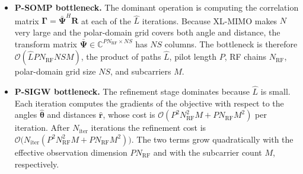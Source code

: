 \documentclass[12pt,a4paper]{article}
\begin{document}
\begin{itemize}
  \item \textbf{P-SOMP bottleneck.}
    The dominant operation is computing the correlation matrix
    $\boldsymbol{\Gamma}=\bar{\boldsymbol{\Psi}}^{H}\mathbf{R}$ at
    each of the $\hat{L}$ iterations.
    Because XL-MIMO makes $N$ very large and the polar-domain grid
    covers both angle and distance, the transform matrix
    $\bar{\boldsymbol{\Psi}}\in\mathbb{C}^{PN_{\mathrm{RF}}\times NS}$
    has $NS$ columns.
    The bottleneck is therefore
    $\mathcal{O}(\hat{L}PN_{\mathrm{RF}}NSM)$,
    the product of paths $\hat{L}$, pilot length $P$, RF chains
    $N_{\mathrm{RF}}$, polar-domain grid size $NS$, and subcarriers $M$.

  \item \textbf{P-SIGW bottleneck.}
    The refinement stage dominates because $\hat{L}$ is small.
    Each iteration computes the gradients of the objective with respect
    to the angles $\hat{\boldsymbol{\theta}}$ and distances $\hat{\mathbf{r}}$,
    whose cost is $\mathcal{O}(P^{2}N_{\mathrm{RF}}^{2}M
    +PN_{\mathrm{RF}}M^{2})$ per iteration.
    After $N_{\mathrm{iter}}$ iterations the refinement cost is
    $\mathcal{O}\!\bigl(N_{\mathrm{iter}}(P^{2}N_{\mathrm{RF}}^{2}M
      +PN_{\mathrm{RF}}M^{2})\bigr)$.
    The two terms grow quadratically with the effective observation
    dimension $PN_{\mathrm{RF}}$ and with the subcarrier count $M$,
    respectively.
\end{itemize}
\end{document}
